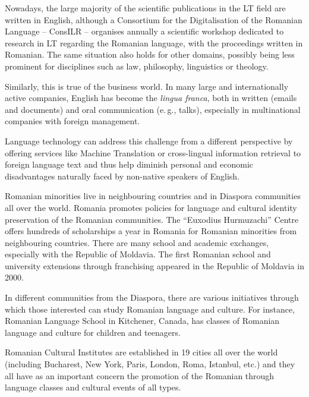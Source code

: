 \begin{multicols}{2}

Nowadays, the large majority of the scientific publications in the LT field are written in English, although a Consortium for the Digitalisation of the Romanian Language -- ConsILR -- organises annually a scientific workshop dedicated to research in LT regarding the Romanian language, with the proceedings written in Romanian. The same situation also holds for other domains, possibly being less prominent for disciplines such as law, philosophy, linguistics or theology. 

Similarly, this is true of the business world. In many large and internationally active companies, English has become the \textit{lingua franca}, both in written (emails and documents) and oral communication (e.\,g., talks), especially in multinational companies with foreign management.

Language technology can address this challenge from a different perspective by offering services like Machine Translation or cross-lingual information retrieval to foreign language text and thus help diminish personal and economic disadvantages naturally faced by non-native speakers of English.

Romanian minorities live in neighbouring countries and in Diaspora communities all over the world. Romania promotes policies for language and cultural identity preservation of the Romanian communities. The ``Euxodius Hurmuzachi'' Centre offers hundreds of scholarships a year in Romania for Romanian minorities from neighbouring countries. There are many school and academic exchanges, especially with the Republic of Moldavia. The first Romanian school and university extensions through franchising appeared in the Republic of Moldavia in 2000.

In different communities from the Diaspora, there are various initiatives through which those interested can study Romanian language and culture. For instance, Romanian Language School in Kitchener, Canada, has classes of Romanian language and culture for children and teenagers.

Romanian Cultural Institutes are established in 19 cities all over the world (including Bucharest, New York, Paris, London, Roma, Istanbul, etc.) and they all have as an important concern the promotion of the Romanian through language classes and cultural events of all types.


\end{multicols}
